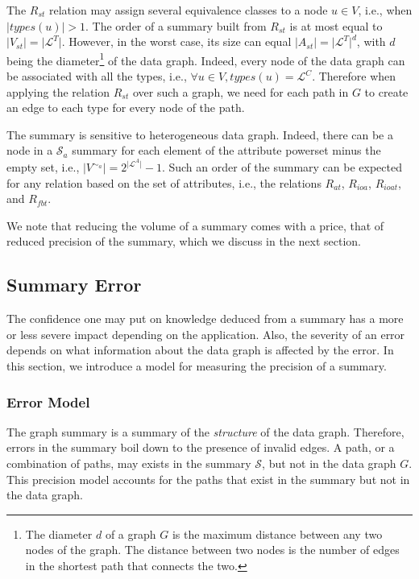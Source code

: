 The $R_{st}$ relation may assign several equivalence classes to a node $u \in V$, i.e., when $\vert types(u) \vert > 1$. The order of a summary built from $R_{st}$ is at most equal to $\vert V_{st} \vert = \vert \mathcal{L}^T \vert$. However, in the worst case, its size can equal $\vert A_{st} \vert = \vert \mathcal{L}^T \vert ^d$, with $d$ being the diameter\footnote{The diameter $d$ of a graph $G$ is the maximum distance between any two nodes of the graph. The distance between two nodes is the number of edges in the shortest path that connects the two.} of the data graph. Indeed, every node of the data graph can be associated with all the types, i.e., $\forall u \in V, types(u) = \mathcal{L}^C$. Therefore when applying the relation $R_{st}$ over such a graph, we need for each path in $G$ to create an edge to each type for every node of the path.

The summary is sensitive to heterogeneous data graph. Indeed, there can be a node in a $\mathcal{S}_a$ summary for each element of the attribute powerset minus the empty set, i.e., $\vert V^{\sim_a} \vert = 2^{\vert \mathcal{L}^A \vert} - 1$. Such an order of the summary can be expected for any relation based on the set of attributes, i.e., the relations $R_{at}$, $R_{ioa}$, $R_{ioat}$, and $R_{fbt}$.

We note that reducing the volume of a summary comes with a price, that of reduced precision of the summary, which we discuss in the next section.

\subsection{Summary Error}

The confidence one may put on knowledge deduced from a summary has a more or less severe impact depending on the application. Also, the severity of an error depends on what information about the data graph is affected by the error. In this section, we introduce a model for measuring the precision of a summary.

\subsubsection{Error Model}

The graph summary is a summary of the \emph{structure} of the data graph. Therefore, errors in the summary boil down to the presence of invalid edges. A path, or a combination of paths, may exists in the summary $\mathcal{S}$, but not in the data graph $G$. This precision model accounts for the paths that exist in the summary but not in the data graph.

